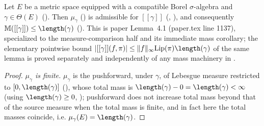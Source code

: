 \begin{lemma}
  Let $E$ be a metric space equipped with a compatible Borel $\sigma$-algebra and $\gamma \in \Theta(E)$ (). Then
  $\mu_\gamma$ () is admissible for $[[\gamma]]$ (,
  ), and consequently $\mathbb{M}([[\gamma]]) \le \length(\gamma)$
  (). This is paper Lemma~4.1 (paper.tex line 1137), specialized to the
  measure-comparison half and its immediate mass corollary; the elementary pointwise bound
  $|[[\gamma]](f,\pi)| \le \|f\|_\infty \mathrm{Lip}(\pi) \length(\gamma)$ of the same lemma is
  proved separately and independently of any mass machinery in .
\end{lemma}
\begin{proof}
  \emph{$\mu_\gamma$ is finite.} $\mu_\gamma$ is the pushforward, under $\gamma$, of Lebesgue
  measure restricted to $[0,\length(\gamma)]$ (), whose total mass is
  $\length(\gamma) - 0 = \length(\gamma) < \infty$ (using $\length(\gamma) \ge 0$,
  ); pushforward does not increase total mass beyond that of the source measure
  when the total mass is finite, and in fact here the total masses coincide, i.e.
  $\mu_\gamma(E) = \length(\gamma)$.


\end{proof}
